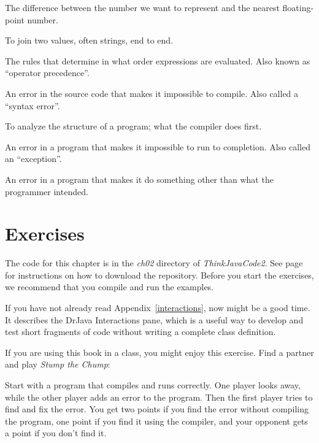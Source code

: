 \begin{description}
The difference between the number we want to represent and the nearest floating-point number.

To join two values, often strings, end to end.

The rules that determine in what order expressions are evaluated.
Also known as ``operator precedence''.

An error in the source code that makes it impossible to compile.
Also called a ``syntax error''.

To analyze the structure of a program; what the compiler does first.

An error in a program that makes it impossible to run to completion.
Also called an ``exception''.

An error in a program that makes it do something other than what the programmer intended.

\end{description}


\section{Exercises}

The code for this chapter is in the {\it ch02} directory of {\it ThinkJavaCode2}.
See page~\pageref{code} for instructions on how to download the repository.
Before you start the exercises, we recommend that you compile and run the examples.

If you have not already read Appendix~\ref{interactions}, now might be a good time.
It describes the DrJava Interactions pane, which is a useful way to develop and test short fragments of code without writing a complete class definition.


\begin{exercise}  %

If you are using this book in a class, you might enjoy this exercise.
Find a partner and play {\it Stump the Chump}:

Start with a program that compiles and runs correctly.
One player looks away, while the other player adds an error to the program.
Then the first player tries to find and fix the error.
You get two points if you find the error without compiling the program, one point if you find it using the compiler, and your opponent gets a point if you don't find it.

\end{exercise}


